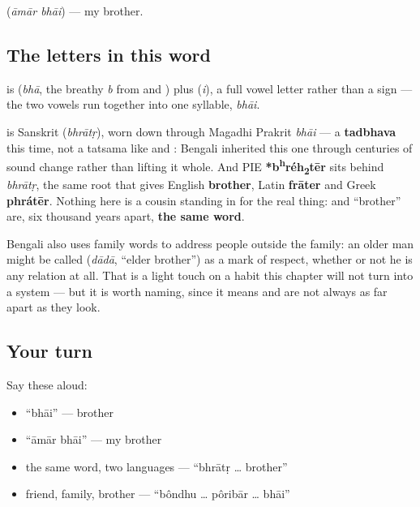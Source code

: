 \textbf{ } (\emph{āmār bhāi}) — my brother.

\subsection*{The letters in this word}
\textbf{} is \textbf{} (\emph{bhā}, the breathy \emph{b} from  and ) plus \textbf{} (\emph{i}), a full vowel letter rather than a sign — the two vowels run together into one syllable, \emph{bhāi}.

\begin{cousinweb}
\textbf{} is Sanskrit \textbf{} (\emph{bhrātṛ}), worn down through Magadhi Prakrit \emph{bhāi} — a \textbf{tadbhava} this time, not a tatsama like  and : Bengali inherited this one through centuries of sound change rather than lifting it whole. And PIE \textbf{*b\textsuperscript{h}réh\textsubscript{2}tēr} sits behind \emph{bhrātṛ}, the same root that gives English \textbf{brother}, Latin \textbf{frāter} and Greek \textbf{phrátēr}. Nothing here is a cousin standing in for the real thing:  and \textquotedblleft{}brother\textquotedblright{} are, six thousand years apart, \textbf{the same word}.

Bengali also uses family words to address people outside the family: an older man might be called \textbf{} (\emph{dādā}, \textquotedblleft{}elder brother\textquotedblright{}) as a mark of respect, whether or not he is any relation at all. That is a light touch on a habit this chapter will not turn into a system — but it is worth naming, since it means  and  are not always as far apart as they look.
\end{cousinweb}

\subsection*{Your turn}
Say these aloud:

\begin{itemize}
\raggedright
  \item \textquotedblleft{}bhāi\textquotedblright{} — brother
  \item \textquotedblleft{}āmār bhāi\textquotedblright{} — my brother
  \item the same word, two languages — \textquotedblleft{}bhrātṛ … brother\textquotedblright{}
  \item friend, family, brother — \textquotedblleft{}bôndhu … pôribār … bhāi\textquotedblright{}
\end{itemize}

